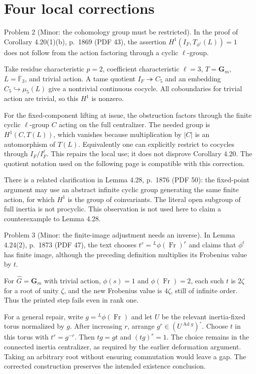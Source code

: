\documentclass[10pt]{article}
\begin{document}
\section*{Four local corrections}
Problem 2 (Minor: the cohomology group must be restricted).  In the proof of Corollary 4.20(1)(b), p. 1869 (PDF 43), the assertion \(H^1(I_F,T_{\phi^\ell}(L))=1\) does not follow from the action factoring through a cyclic \(\ell\)-group.\par
Take residue characteristic \(p=2\), coefficient characteristic \(\ell=3\), \(T=\mathbf G_m\), \(L=\overline{\mathbb F}_3\), and trivial action. A tame quotient \(I_F\twoheadrightarrow C_5\) and an embedding \(C_5\hookrightarrow\mu_5(L)\) give a nontrivial continuous cocycle. All coboundaries for trivial action are trivial, so this \(H^1\) is nonzero.\par
For the fixed-component lifting at issue, the obstruction factors through the finite cyclic \(\ell\)-group \(C\) acting on the full centralizer. The needed group is \(H^1(C,T(L))\), which vanishes because multiplication by \(|C|\) is an automorphism of \(T(L)\). Equivalently one can explicitly restrict to cocycles through \(I_F/I_F^\ell\). This repairs the local use; it does not disprove Corollary 4.20. The quotient notation used on the following page is compatible with this correction.\par
There is a related clarification in Lemma 4.28, p. 1876 (PDF 50): the fixed-point argument may use an abstract infinite cyclic group generating the same finite action, for which \(H^1\) is the group of coinvariants. The literal open subgroup of full inertia is not procyclic. This observation is not used here to claim a counterexample to Lemma 4.28.\par
Problem 3 (Minor: the finite-image adjustment needs an inverse).  In Lemma 4.24(2), p. 1873 (PDF 47), the text chooses \(t^r={}^{L}\phi(\operatorname{Fr})^r\) and claims that \(\phi^t\) has finite image, although the preceding definition multiplies its Frobenius value by \(t\).\par
For \(\widehat G=\mathbf G_m\) with trivial action, \(\phi(s)=1\) and \(\phi(\operatorname{Fr})=2\), each such \(t\) is \(2\zeta\) for a root of unity \(\zeta\), and the new Frobenius value is \(4\zeta\), still of infinite order. Thus the printed step fails even in rank one.\par
For a general repair, write \(g={}^{L}\phi(\operatorname{Fr})\) and let \(U\) be the relevant inertia-fixed torus normalized by \(g\). After increasing \(r\), arrange \(g^r\in(U^{\operatorname{Ad}g})^\circ\). Choose \(t\) in this torus with \(t^r=g^{-r}\). Then \(tg=gt\) and \((tg)^r=1\). The choice remains in the connected inertia centralizer, as required by the earlier deformation argument. Taking an arbitrary root without ensuring commutation would leave a gap. The corrected construction preserves the intended existence conclusion.\par
\end{document}
